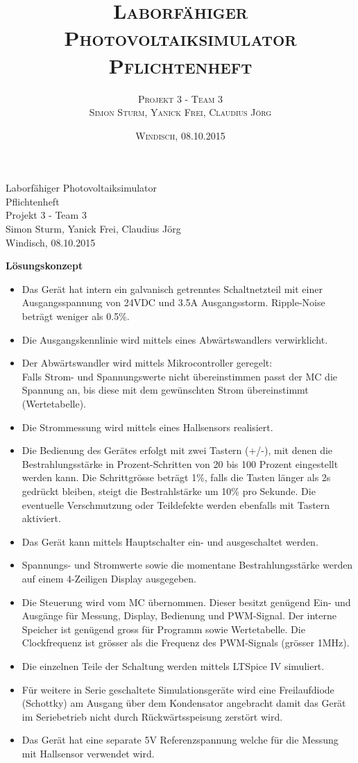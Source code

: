 \documentclass{fhnwreport}
\title{%
  \textsc{Laborfähiger Photovoltaiksimulator}\\
  \textsc{Pflichtenheft}}
\author{%
  \textsc{Projekt 3 - Team 3}\\
  \textsc{Simon Sturm, Yanick Frei,
Claudius Jörg}}
\date{%
  \textsc{Windisch, 08.10.2015}}
\begin{document}
\begin{center}
\Large Laborfähiger Photovoltaiksimulator\\
Pflichtenheft\\
\large Projekt 3 - Team 3\\
Simon Sturm, Yanick Frei, Claudius Jörg\\
Windisch, 08.10.2015
\end{center}


\textbf{Lösungskonzept}
\begin{itemize}
	\item Das Gerät hat intern ein galvanisch getrenntes Schaltnetzteil mit einer Ausgangsspannung von 24VDC und 3.5A Ausgangsstorm. Ripple-Noise beträgt weniger als 0.5\%.
	\item Die Ausgangskennlinie wird mittels eines Abwärtswandlers verwirklicht.
	\item Der Abwärtswandler wird mittels Mikrocontroller geregelt:\\
	Falls Strom- und Spannungswerte nicht übereinstimmen passt der	MC die Spannung an, bis diese mit dem gewünschten Strom übereinstimmt (Wertetabelle).
	\item Die Strommessung wird mittels eines Hallsensors realisiert.
	\item Die Bedienung des Gerätes erfolgt mit zwei Tastern (+/-), mit denen die Bestrahlungsstärke in Prozent-Schritten von 20 bis 100 Prozent eingestellt werden kann. Die Schrittgrösse beträgt 1\%, falls die Tasten länger als 2s gedrückt bleiben, steigt die Bestrahlstärke um 10\% pro Sekunde. Die eventuelle Verschmutzung oder Teildefekte werden ebenfalls mit Tastern aktiviert.
	\item Das Gerät kann mittels Hauptschalter ein- und ausgeschaltet werden.
	\item Spannungs- und Stromwerte sowie die momentane Bestrahlungsstärke werden auf einem 4-Zeiligen Display ausgegeben.
	\item Die Steuerung wird vom MC übernommen. Dieser besitzt genügend Ein- und Ausgänge für Messung, Display, Bedienung und PWM-Signal. Der interne Speicher ist genügend gross für Programm sowie Wertetabelle. Die Clockfrequenz ist grösser als die Frequenz des PWM-Signals (grösser 1MHz).
	\item Die einzelnen Teile der Schaltung werden mittels LTSpice IV simuliert.
	\item Für weitere in Serie geschaltete Simulationsgeräte wird eine Freilaufdiode (Schottky) am Ausgang über dem Kondensator angebracht damit das Gerät im Seriebetrieb nicht durch Rückwärtsspeisung zerstört wird.
	\item Das Gerät hat eine separate 5V Referenzspannung welche für die Messung mit Hallsensor verwendet wird.
\end{itemize}
\end{document}
